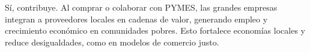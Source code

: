 \begin{solution}
\begin{enumerate}[label=\alph*)]
			Sí, contribuye. Al comprar o colaborar con PYMES, las grandes empresas integran a proveedores locales en cadenas de
			valor, generando empleo y crecimiento económico en comunidades pobres. Esto fortalece economías locales y reduce 
			desigualdades, como en modelos de comercio justo.
	
	\end{enumerate}

\end{solution}
